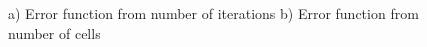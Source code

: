 \begin{figure}[h]\label{ERROR}
\begin{minipage}[h]{0.49\linewidth}
\end{minipage}
\hfill
\begin{minipage}[h]{0.49\linewidth}
\end{minipage}
\caption{a) Error function from number of iterations b) Error function from
number of cells}
\end{figure}

